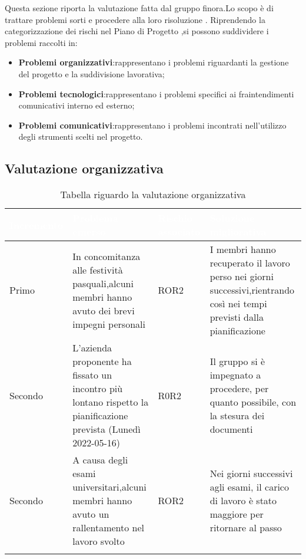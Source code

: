 Questa sezione riporta la valutazione fatta dal gruppo finora.Lo scopo è di trattare problemi sorti e procedere alla loro risoluzione .
Riprendendo la categorizzazione  dei rischi nel Piano di Progetto ,si possono suddividere i problemi raccolti in:

\begin{itemize}
	\item \textbf{Problemi organizzativi}:rappresentano i problemi riguardanti la gestione del progetto e la suddivisione lavorativa;
   \item \textbf{Problemi tecnologici}:rappresentano i problemi specifici ai fraintendimenti comunicativi interno ed esterno;
   \item \textbf{Problemi comunicativi}:rappresentano i problemi incontrati  nell’utilizzo degli strumenti scelti nel progetto.
 
\end{itemize}

\subsection{Valutazione organizzativa}
{
    \setlength{\freewidth}{\dimexpr\textwidth-10\tabcolsep}
    \renewcommand{\arraystretch}{1.5}
    \centering
    \setlength{\aboverulesep}{0pt}
    \setlength{\belowrulesep}{0pt}
    \begin{longtable}{C{.25\freewidth} C{.257\freewidth} C{.16\freewidth} C{.4\freewidth}}
       \toprule
    \textcolor{white}{\textbf{Incremento}}&
    \textcolor{white}{\textbf{Problema emerso}}&
    \textcolor{white}{\textbf{Rischio associato}}&
    \textcolor{white}{\textbf{Soluzione migliorativa}}\\	
    \toprule
    \endhead
    
   Primo & In concomitanza alle festività pasquali,alcuni membri hanno avuto dei brevi impegni personali & 
          ROR2 &I membri hanno recuperato il lavoro perso nei giorni successivi,rientrando così nei tempi previsti dalla pianificazione \\
   Secondo & L'azienda proponente ha fissato un incontro più lontano rispetto la pianificazione prevista (Lunedì 2022-05-16) &
            R0R2 & Il gruppo si è impegnato a procedere, per quanto possibile, con la stesura dei documenti \\
   Secondo & A causa degli esami universitari,alcuni membri hanno avuto un rallentamento nel lavoro svolto & 
           ROR2 & Nei giorni successivi agli esami, il carico di lavoro è stato maggiore per ritornare al passo \\
    
   \bottomrule
   \caption{Tabella riguardo la valutazione organizzativa}
   \end{longtable}
}

